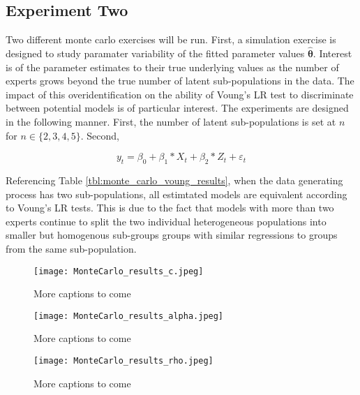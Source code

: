 \documentclass[12pt]{article}
\theoremstyle{definition}
\begin{document}
\subsection{Experiment Two}

Two different monte carlo exercises will be run. First, a simulation
exercise is designed to study paramater variability of the fitted 
parameter values $\hat{\boldsymbol{\theta}}$. Interest is of the parameter estimates to their true underlying values as the number of experts grows beyond the true number of latent sub-populations in the data. The impact of this overidentification on the ability of Voung's LR test to discriminate between potential models is of particular interest. The experiments are designed in the following manner. First, the number of latent sub-populations is set at $n$ for $n \in \{2, 3, 4, 5\}$. Second, 

\begin{equation} \label{eq:MC_generic_regression}
  y_{t} = \beta_{0} + \beta_{1} * X_{t} + \beta_{2} * Z_{t} + \varepsilon_{t}
\end{equation}

Referencing Table \ref{tbl:monte_carlo_voung_results}, when the data
generating process has two sub-populations, all estimtated  models are equivalent according to Voung's LR tests. This is due to the fact that models with more than two experts continue to split the two individual heterogeneous populations into smaller but homogenous sub-groups groups with similar regressions to groups from the same sub-population.


\begin{figure}[t!]
  \texttt{[image: MonteCarlo\_results\_c.jpeg]}
  \caption{More captions to come}
  \label{fig:MonteCarlo_results_c}
\end{figure}


\begin{figure}[t!]
  \texttt{[image: MonteCarlo\_results\_alpha.jpeg]}
  \caption{More captions to come}
  \label{fig:MonteCarlo_results_alpha}
\end{figure}


\begin{figure}[t!]
  \texttt{[image: MonteCarlo\_results\_rho.jpeg]}
  \caption{More captions to come}
  \label{fig:MonteCarlo_results_rho}
\end{figure}
\end{document}
